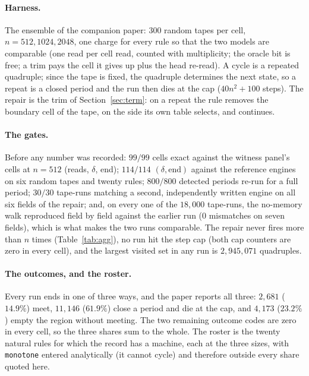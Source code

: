 \documentclass[11pt]{article}
\theoremstyle{remark}
\begin{document}
\paragraph{Harness.} The ensemble of the companion paper: $300$ random tapes per cell, $n=512,1024,2048$,
one charge for every rule so that the two models are comparable (one read per cell read, counted with
multiplicity; the oracle bit is free; a trim pays the cell it gives up plus the head re-read). A cycle is a
repeated quadruple; since the tape is fixed, the quadruple determines the next state, so a repeat is a closed
period and the run then dies at the cap ($40n^{2}+100$ steps). The repair is the trim of
Section~\ref{sec:term}: on a repeat the rule removes the boundary cell of the tape, on the side its own table
selects, and continues.

\paragraph{The gates.} Before any number was recorded: $99/99$ cells exact against the witness panel's cells
at $n=512$ (reads, $\delta$, end); $114/114$ $(\delta,\text{end})$ against the reference engines on six
random tapes and twenty rules; $800/800$ detected periods re-run for a full period; $30/30$ tape-runs
matching a second, independently written engine on all six fields of the repair; and, on every one of the
$18{,}000$ tape-runs, the no-memory walk reproduced field by field against the earlier run ($0$ mismatches on
seven fields), which is what makes the two runs comparable. The repair never fires more than $n$ times
(Table~\ref{tab:agg}), no run hit the step cap (both cap counters are zero in every cell), and the largest visited set in any run is $2{,}945{,}071$ quadruples.

\begin{table}[t]
\centering
\small

\caption{One row per rule at $n=512$, $300$ tapes, with the trim repair. \emph{BTHM-0}: the share of tapes
that meet, and the share that close a period and die at the cap. \emph{cycle}: the median period length in
steps and the median window width at the repeat. \emph{BTHM-C}: the meeting share, the rescued share of the
cap-diers, and the median number of repair trims a rescued tape needs. \emph{reads}: the median over the
tapes the companion paper counts, and over all tapes under the bit.}
\label{tab:cyc}
\end{table}

\paragraph{The outcomes, and the roster.} Every run ends in one of three ways, and the paper reports all three: $2{,}681$ ($14.9\%$) meet, $11{,}146$ ($61.9\%$) close a period and die at the cap, and $4{,}173$ ($23.2\%$) empty the region without meeting. The two remaining outcome codes are zero in every cell, so the three shares sum to the whole. The roster is the twenty natural rules for which the record has a machine, each at the three sizes, with \texttt{monotone} entered analytically (it cannot cycle) and therefore outside every share quoted here.
\end{document}
